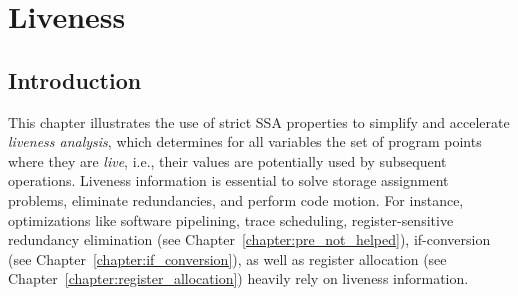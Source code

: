 \chapter{Liveness }
\label{chapter:ssa_tells_nothing_of_liveness}
\newcommand{\name}[1]{#1}
\newcommand{\firm}{\name{LibFirm}}
\newcommand{\lao}{\name{LAO}}
\newcommand{\stm}{\name{STMicroelectronics}}
\newcommand{\Nat}{\mathbb{N}}
\newcommand{\void}[1]{ }
\newcommand{\lstart}{\textrm{start}}
\newcommand{\paper}{paper\xspace}
\newcommand{\vundef}{\Box}
\newcommand{\domzone}[1]{\mathit{dom}({#1})}
\newcommand{\sdomzone}[1]{\mathit{sdom}({#1})}
\newcommand{\prenum}[1]{\mathit{prenum}({#1})}
\newcommand{\back}[1]{\mathcal{B}_{#1}}
\newcommand{\lb}[1]{\mathbf{#1}}
\newcommand{\ldef}[1]{\mathit{def}(\var{#1})}
\newcommand{\luse}[1]{\mathit{uses}(\var{#1})}
\newcommand{\reach}[2]{{#1}\rightarrow {#2}}
\newcommand{\redreach}[2]{{#1}\rightharpoondown {#2}}
\newcommand{\red}[1]{\widetilde{#1}}
\newcommand{\BEsrc}{V^\otimes}
\newcommand{\BEtgt}{V^\odot}
\newcommand{\BE}{E^\uparrow}
\newcommand{\Tqa}{T_{(q,\var a)}}
\newcommand{\alain}[1]{{\color{red} #1}}
\newcommand{\reduced}{forward}
\newcommand{\Reduced}{Forward}
\def\Live{\textrm{Live}}
\def\LiveOut{\textrm{LiveOut}}
\def\LiveIn{\textrm{LiveIn}}
\def\PhiKill{\textrm{PhiDefs}}
\def\PhiUses{\textrm{PhiUses}}
\def\Kill{\textrm{Defs}}
\def\Exit{\textrm{Exit}}
\def\Entry{\textrm{Entry}}
\def\UpExp{\textrm{UpwardExposed}}
\def\cfgsuccs{\textrm{CFG\_succs}}
\def\union{\cup}
\def\Def{\textrm{def}}
\def\phidefedge{\texttt{phidef\_edge}}
\def\phiuseedge{\texttt{phiuse\_edge}}
\def\top{\textrm{top}}
\def\push{\textrm{push}}
\def\pop{\textrm{pop}}

\section{Introduction}
This chapter illustrates the use of strict SSA properties to simplify and accelerate \emph{liveness analysis}, which determines for all variables the set of program points where they are \emph{live}, i.e., their values are potentially used by subsequent operations.
Liveness information is essential to solve storage assignment problems, eliminate redundancies, and perform code motion.
For instance, optimizations like software pipelining, trace scheduling, register-sensitive redundancy elimination (see Chapter~\ref{chapter:pre_not_helped}), if-conversion (see Chapter~\ref{chapter:if_conversion}), as well as register allocation (see Chapter~\ref{chapter:register_allocation}) heavily rely on liveness information.

